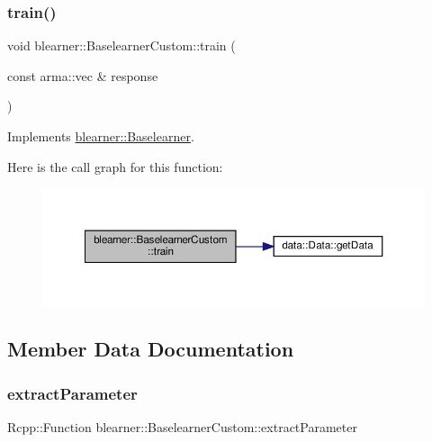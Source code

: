 \subsubsection{\texorpdfstring{train()}{train()}}
{\footnotesize\ttfamily void blearner\+::\+Baselearner\+Custom\+::train (\begin{DoxyParamCaption}\item[{const arma\+::vec \&}]{response }\end{DoxyParamCaption})\hspace{0.3cm}{\ttfamily [virtual]}}



Implements \hyperlink{classblearner_1_1_baselearner_a40e03ad070b9a03aae706d9ee8094b80}{blearner\+::\+Baselearner}.

Here is the call graph for this function\+:
\nopagebreak
\begin{figure}[H]
\begin{center}
\leavevmode
\includegraphics[width=350pt]{classblearner_1_1_baselearner_custom_a31e3921f86f267d36135d07bf1d16551_cgraph}
\end{center}
\end{figure}


\subsection{Member Data Documentation}
\mbox{\label{classblearner_1_1_baselearner_custom_a4b88f7464f9c686a35d40f438119ea40}} 
\subsubsection{\texorpdfstring{extract\+Parameter}{extractParameter}}
{\footnotesize\ttfamily Rcpp\+::\+Function blearner\+::\+Baselearner\+Custom\+::extract\+Parameter\hspace{0.3cm}{\ttfamily [private]}}

